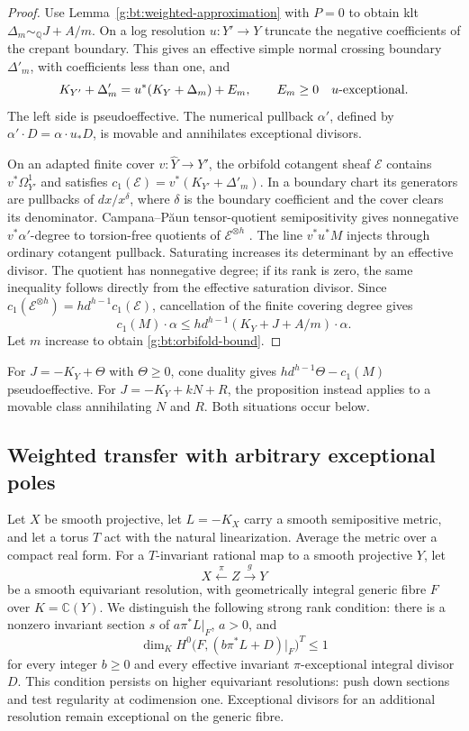 \begin{proof}
Use Lemma~\ref{g:bt:weighted-approximation} with $P=0$ to obtain klt
$\Delta_m\sim_{\mathbb Q}J+A/m$.  On a log resolution $u:Y'\to Y$
truncate the negative coefficients of the crepant boundary.  This gives
an effective simple normal crossing boundary $\Delta'_m$, with
coefficients less than one, and
\[
 K_{Y'}+\Delta'_m=u^*(K_Y+\Delta_m)+E_m,\qquad
 E_m\geq0\quad\hbox{$u$-exceptional}.
\]
The left side is pseudoeffective.  The numerical pullback $\alpha'$,
defined by $\alpha'\cdot D=\alpha\cdot u_*D$, is movable and annihilates
exceptional divisors.

On an adapted finite cover $v:\widehat Y\to Y'$, the orbifold cotangent
sheaf $\mathcal E$ contains $v^*\Omega^1_{Y'}$ and satisfies
$c_1(\mathcal E)=v^*(K_{Y'}+\Delta'_m)$.  In a boundary chart its
generators are pullbacks of $dx/x^\delta$, where $\delta$ is the boundary
coefficient and the cover clears its denominator.  Campana--P\u aun
tensor-quotient semipositivity gives nonnegative $v^*\alpha'$-degree to
torsion-free quotients of $\mathcal E^{\otimes h}$
\cite[Theorem~1.3]{CampanaPaun2019}.
The line $v^*u^*M$ injects through ordinary cotangent pullback.
Saturating increases its determinant by an effective divisor.  The
quotient has nonnegative degree; if its rank is zero, the same inequality
follows directly from the effective saturation divisor.  Since
$c_1(\mathcal E^{\otimes h})=h d^{h-1}c_1(\mathcal E)$, cancellation of
the finite covering degree gives
\[
 c_1(M)\cdot\alpha\leq
    h d^{h-1}(K_Y+J+A/m)\cdot\alpha.
\]
Let $m$ increase to obtain \eqref{g:bt:orbifold-bound}.
\end{proof}

For $J=-K_Y+\Theta$ with $\Theta\geq0$, cone duality gives
$h d^{h-1}\Theta-c_1(M)$ pseudoeffective.
For $J=-K_Y+kN+R$, the proposition instead applies to a movable class
annihilating $N$ and $R$.  Both situations occur below.

\subsection{Weighted transfer with arbitrary exceptional poles}
\label{g:bt:exceptional}

Let $X$ be smooth projective, let $L=-K_X$ carry a smooth semipositive
metric, and let a torus $T$ act with the natural linearization.  Average
the metric over a compact real form.  For a $T$-invariant rational map to
a smooth projective $Y$, let
\[
                 X\xleftarrow{\pi}Z\xrightarrow{g}Y
\]
be a smooth equivariant resolution, with geometrically integral generic
fibre $F$ over $K=\mathbb C(Y)$.  We distinguish the following strong
rank condition: there is a nonzero invariant section $s$ of
$a\pi^*L|_F$, $a>0$, and
\begin{equation}\label{g:bt:all-exceptional-rank}
 \dim_K H^0\bigl(F,(b\pi^*L+D)|_F\bigr)^T\leq1
\end{equation}
for every integer $b\geq0$ and every effective invariant
$\pi$-exceptional integral divisor $D$.
This condition persists on higher equivariant resolutions: push down
sections and test regularity at codimension one.  Exceptional divisors
for an additional resolution remain exceptional on the generic fibre.

